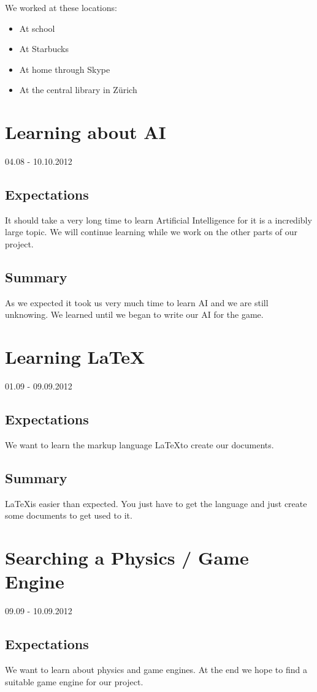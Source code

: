 We worked at these locations:
\begin{itemize}
  \item At school
  \item At Starbucks
  \item At home through Skype
  \item At the central library in Zürich
\end{itemize}

\section{Learning about AI}
04.08 - 10.10.2012
\subsection*{Expectations}
It should take a very long time to learn Artificial Intelligence for it is a incredibly large topic. We will continue learning while we work on the other parts of our project. 
\subsection*{Summary}
As we expected it took us very much time to learn AI and we are still unknowing. We learned until we began to write our AI for the game.

\section{Learning \LaTeX}
01.09 - 09.09.2012
\subsection*{Expectations}
We want to learn the markup language \LaTeX to create our documents.
\subsection*{Summary}
\LaTeX is easier than expected. You just have to get the language and just create some documents to get used to it.

\section{Searching a Physics / Game Engine}
09.09 - 10.09.2012
\subsection*{Expectations}
We want to learn about physics and game engines. At the end we hope to find a suitable game engine for our project.
